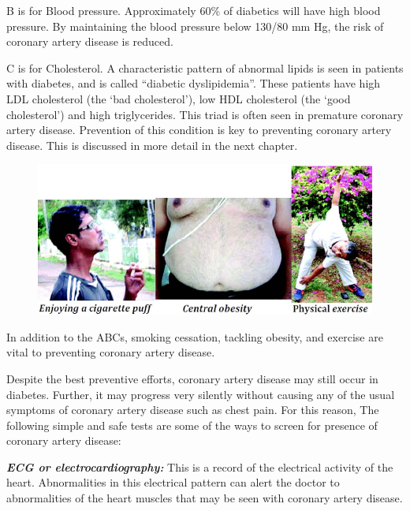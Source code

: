 { \item B is for Blood pressure. Approximately 60\% of diabetics will have high blood pressure. By maintaining the blood pressure below 130/80 mm Hg, the risk of coronary artery disease is reduced.

 \item C is for Cholesterol. A characteristic pattern of abnormal lipids is seen in patients with diabetes, and is called “diabetic dyslipidemia”. These patients have high LDL cholesterol (the ‘bad cholesterol’), low HDL cholesterol (the ‘good cholesterol’) and high triglycerides. This triad is often seen in premature coronary artery disease. Prevention of this condition is key to preventing coronary artery disease. This is discussed in more detail in the next chapter.


\begin{figure}
\includegraphics{images/043.jpg}
\end{figure}

In addition to the ABCs, smoking cessation, tackling obesity, and exercise are vital to preventing coronary artery disease.


Despite the best preventive efforts, coronary artery disease may still occur in diabetes. Further, it may progress very silently without causing any of the usual symptoms of coronary artery disease such as chest pain. For this reason,  The following simple and safe tests are some of the ways to screen for presence of coronary artery disease:

\item \textbf{\textit{ECG or electrocardiography:}} This is a record of the electrical activity of the heart. Abnormalities in this electrical pattern can alert the doctor to abnormalities of the heart muscles that may be seen with coronary artery disease.

}
